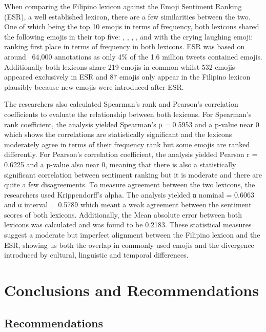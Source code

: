 When comparing the Filipino lexicon against the Emoji Sentiment Ranking (ESR), a well established lexicon, there are a few similarities between the two. One of which being the top 10 emojis in terms of frequency, both lexicons shared the following emojis in their top five: , , , , and  with the crying laughing emoji:  ranking first place in terms of frequency in both lexicons. ESR was based on around ~64,000 annotations as only 4\% of the 1.6 million tweets contained emojis. Additionally both lexicons share 219 emojis in common whilst 532 emojis appeared exclusively in ESR and 87 emojis only appear in the Filipino lexicon plausibly because new emojis were introduced after ESR.

The researchers also calculated Spearman’s rank and Pearson’s correlation coefficients to evaluate the relationship between both lexicons. For Spearman's rank coefficient, the analysis yielded Spearman's ρ = 0.5953 and a p-value near 0 which shows the correlations are statistically significant and the lexicons moderately agree in terms of their frequency rank but some emojis are ranked differently. For Pearson’s correlation coefficient, the analysis yielded Pearson r = 0.6225 and a p-value also near 0, meaning that there is also a statistically significant correlation between sentiment ranking but it is moderate and there are quite a few disagreements. To measure agreement between the two lexicons, the researchers used Krippendorff’s alpha. The analysis yielded α nominal = 0.6063 and α interval = 0.5789 which meant a weak agreement between the sentiment scores of both lexicons. Additionally, the Mean absolute error between both lexicons was calculated and was found to be 0.2183. These statistical measures suggest a moderate but imperfect alignment between the Filipino lexicon and the ESR, showing us both the overlap in commonly used emojis and the divergence introduced by cultural, linguistic and temporal differences.

\chapter{Conclusions and Recommendations}

\section{Recommendations}

